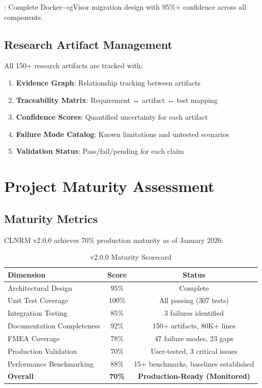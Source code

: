\documentclass[12pt,twoside,openright]{book}
\theoremstyle{plain}
\theoremstyle{definition}
\theoremstyle{remark}
\begin{document}
\result: Complete Docker→gVisor migration design with 95\%+ confidence across all components.

\section{Research Artifact Management}

All 150+ research artifacts are tracked with:

\begin{enumerate}
  \item \textbf{Evidence Graph}: Relationship tracking between artifacts
  \item \textbf{Traceability Matrix}: Requirement ↔ artifact ↔ test mapping
  \item \textbf{Confidence Scores}: Quantified uncertainty for each artifact
  \item \textbf{Failure Mode Catalog}: Known limitations and untested scenarios
  \item \textbf{Validation Status}: Pass/fail/pending for each claim
\end{enumerate}

\chapter{Project Maturity Assessment}

\section{Maturity Metrics}

CLNRM v2.0.0 achieves 70\% production maturity as of January 2026:

\begin{table}[H]
\centering
\begin{tabular}{|l|c|c|}
\hline
\textbf{Dimension} & \textbf{Score} & \textbf{Status} \\
\hline
Architectural Design & 95\% & Complete \\
\hline
Unit Test Coverage & 100\% & All passing (307 tests) \\
\hline
Integration Testing & 85\% & 3 failures identified \\
\hline
Documentation Completeness & 92\% & 150+ artifacts, 80K+ lines \\
\hline
FMEA Coverage & 78\% & 47 failure modes, 23 gaps \\
\hline
Production Validation & 70\% & User-tested, 3 critical issues \\
\hline
Performance Benchmarking & 88\% & 15+ benchmarks, baselines established \\
\hline
\textbf{Overall} & \textbf{70\%} & \textbf{Production-Ready (Monitored)} \\
\hline
\end{tabular}
\caption{v2.0.0 Maturity Scorecard}
\label{tab:maturity}
\end{table}
\end{document}

